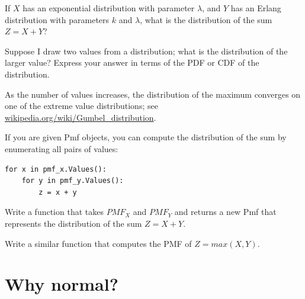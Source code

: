 \documentclass[12pt]{book}
\begin{document}

\begin{exercise}
If $X$ has an exponential distribution with parameter
$\lambda$, and $Y$ has an Erlang distribution with parameters
$k$ and $\lambda$, what is the distribution of the sum $Z = X + Y$?


\end{exercise}

\begin{exercise}
Suppose I draw two values from a distribution; what is the distribution
of the larger value?  Express your answer in terms of the PDF or CDF of
the distribution.


As the number of values increases, the distribution of the maximum
converges on one of the extreme value distributions; see
\url{wikipedia.org/wiki/Gumbel_distribution}.


\end{exercise}

\begin{exercise}
If you are given Pmf objects, you can compute the distribution of
the sum by enumerating all pairs of values:


\begin{verbatim}
for x in pmf_x.Values():
    for y in pmf_y.Values():
        z = x + y
\end{verbatim}

Write a function that takes $PMF_X$ and
$PMF_Y$ and returns a new Pmf that represents the distribution of
the sum $Z = X+Y$.

Write a similar function that computes the PMF of $Z = max(X,Y)$.

\end{exercise}



\section{Why normal?}
\label{why_normal}

\end{document}
